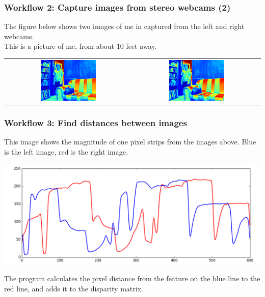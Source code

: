 \documentclass[19pt]{beamer}
\begin{document}
\begin{frame}
\frametitle{Workflow 2: Capture images from stereo webcams (2)}

The figure below shows two images of me in captured from the left and right webcams.\\[10pt]
%
This is a picture of me, from about 10 feet away.\\[20pt]

\begin{center}
\setlength{}
\begin{tabular}{cc}
\includegraphics[width=0.45\textwidth]{images/l.png} &
\includegraphics[width=0.45\textwidth]{images/r.png} 
\end{tabular}
\end{center}

\end{frame}


\begin{frame}
\frametitle{Workflow 3: Find distances between images}
This image shows the magnitude of one pixel strips from the images above. Blue is the left image, red is the right image.
\begin{center}
\includegraphics[width=1\textwidth]{images/strips.png} \\[10pt]
\end{center}
The program calculates the pixel distance from the feature on the blue line to the red line, and adds it to the disparity matrix.
\end{frame}
\end{document}
